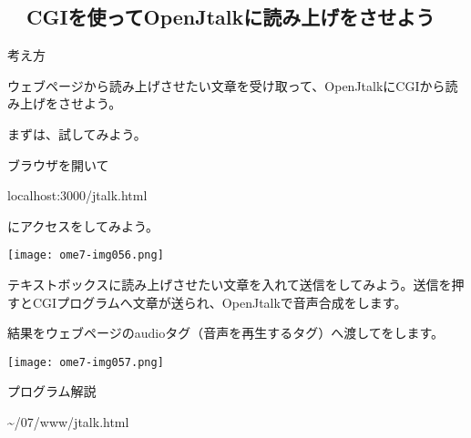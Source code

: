 \clearpage
\subsection*{\theExercise　CGIを使ってOpenJtalkに読み上げをさせよう}
\addtocounter{Exercise}{-1}\label{E:Jtalk}
考え方

ウェブページから読み上げさせたい文章を受け取って、OpenJtalkにCGIから読み上げをさせよう。

まずは、試してみよう。

ブラウザを開いて

localhost:3000/jtalk.html

にアクセスをしてみよう。

%


\centering
\texttt{[image: ome7-img056.png]}
\flushleft

テキストボックスに読み上げさせたい文章を入れて送信をしてみよう。送信を押すとCGIプログラムへ文章が送られ、OpenJtalkで音声合成をします。

結果をウェブページのaudioタグ（音声を再生するタグ）へ渡してをします。

%
%

\centering
\texttt{[image: ome7-img057.png]}
\flushleft

\clearpage
\noindent プログラム解説

{\textasciitilde}/07/www/jtalk.html

